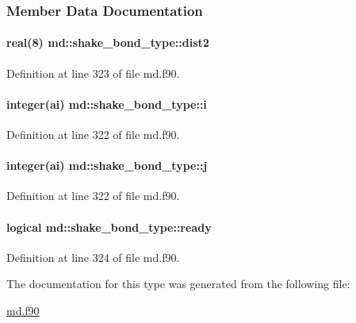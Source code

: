\subsubsection{Member Data Documentation}
\hypertarget{structmd_1_1shake__bond__type_a55ffab02eed2d26c09ee5871fd4a1201}{
\paragraph[{dist2}]{\setlength{\rightskip}{0pt plus 5cm}real(8) md\-::shake\-\_\-bond\-\_\-type\-::dist2}}\label{structmd_1_1shake__bond__type_a55ffab02eed2d26c09ee5871fd4a1201}


Definition at line 323 of file md.\-f90.

\hypertarget{structmd_1_1shake__bond__type_a4f4d13a5d1d345e84277578e94ed5168}{
\paragraph[{i}]{\setlength{\rightskip}{0pt plus 5cm}integer(ai) md\-::shake\-\_\-bond\-\_\-type\-::i}}\label{structmd_1_1shake__bond__type_a4f4d13a5d1d345e84277578e94ed5168}


Definition at line 322 of file md.\-f90.

\hypertarget{structmd_1_1shake__bond__type_ab09ad43829ab07471b613ba621958f19}{
\paragraph[{j}]{\setlength{\rightskip}{0pt plus 5cm}integer(ai) md\-::shake\-\_\-bond\-\_\-type\-::j}}\label{structmd_1_1shake__bond__type_ab09ad43829ab07471b613ba621958f19}


Definition at line 322 of file md.\-f90.

\hypertarget{structmd_1_1shake__bond__type_a91f180f1235ac623cfb43e8a4d3c407d}{
\paragraph[{ready}]{\setlength{\rightskip}{0pt plus 5cm}logical md\-::shake\-\_\-bond\-\_\-type\-::ready}}\label{structmd_1_1shake__bond__type_a91f180f1235ac623cfb43e8a4d3c407d}


Definition at line 324 of file md.\-f90.



The documentation for this type was generated from the following file\-:\begin{DoxyCompactItemize}
\item 
\hyperlink{md_8f90}{md.\-f90}\end{DoxyCompactItemize}
